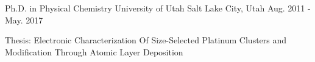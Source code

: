 


\begin{cventries}


\cventry
{Ph.D. in Physical Chemistry} %
{University of Utah} %
{Salt Lake City, Utah} %
{Aug. 2011 - May. 2017} %
{ %
\begin{cvitems}
\item {Thesis: Electronic Characterization Of Size-Selected Platinum Clusters
    and Modification Through Atomic Layer Deposition}
\end{cvitems}
}


\end{cventries}
